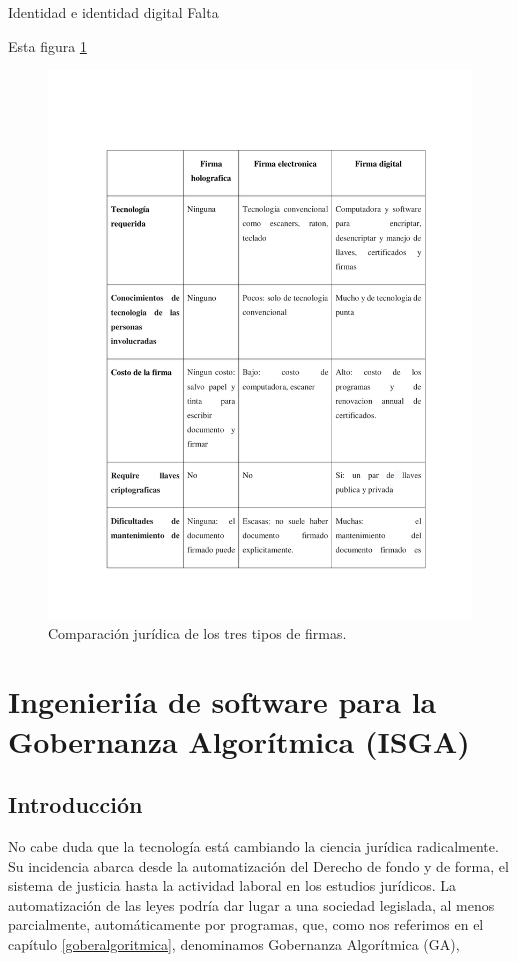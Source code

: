 \documentclass[12pt]{report} %
\begin{document}
Identidad e identidad digital
Falta

Esta figura \ref{Fig.Tablafirmas}

\begin{figure}
\centering
\includegraphics[width=0.85\columnwidth]{imagenes/tablafirmas.pdf}
\caption{Comparación jurídica de los tres tipos de firmas. }
\label{Fig.Tablafirmas}
\end{figure} 








\chapter{Ingenieriía de software para la Gobernanza Algorítmica (ISGA)}
\label{ngenieriía de software para la Gobernanza Algorítmica (ISGA)}

\section{Introducción}

No cabe duda que la tecnología está cambiando la ciencia jurídica radicalmente. Su incidencia abarca desde la automatización del Derecho de fondo y de forma, el sistema de justicia hasta la actividad laboral en los estudios jurídicos. La automatización de las leyes podría dar lugar a una sociedad legislada, al menos parcialmente, automáticamente por programas, que, como nos referimos en el capítulo \ref{goberalgoritmica}, denominamos Gobernanza Algorítmica (GA), 
\end{document}
